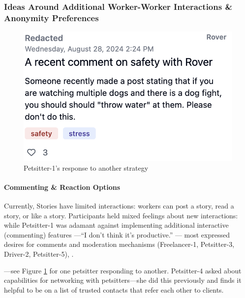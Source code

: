 \subsubsection{{Ideas Around Additional Worker-Worker Interactions \& Anonymity Preferences}}

\FloatBarrier
\begin{figure}[h!]
    \centering
\includegraphics[width=0.4\linewidth]{Chapters/images/p1_dogs.png}
    \caption{Petsitter-1's response to another strategy}
    \label{dogs}
\end{figure}
\FloatBarrier

\paragraph{\textbf{Commenting \& Reaction Options}}
Currently, Stories have limited interactions: workers can post a story, read a story, or like a story. Participants held mixed feelings about new interactions{: while Petsitter-1 was adamant against implementing additional interactive (commenting) features ---``I don't think it's productive.'' --- most} expressed desires for comments and moderation mechanisms (Freelancer-1, Petsitter-3, Driver-2, Petsitter-5), 
.

---see Figure \ref{dogs} for one petsitter responding to another. Petsitter-4 {asked} about capabilities for networking with petsitters---she did this previously and finds it helpful to be on a list of trusted contacts that refer each other to clients. 

